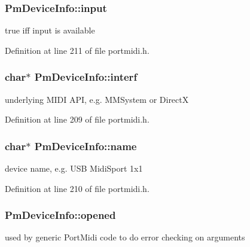 \subsubsection[{\texorpdfstring{input}{input}}]{ Pm\+Device\+Info\+::input}\hypertarget{struct_pm_device_info_a9447230099afd8efc3f57906a02f6eba}{}\label{struct_pm_device_info_a9447230099afd8efc3f57906a02f6eba}
true iff input is available 

Definition at line 211 of file portmidi.\+h.

\subsubsection[{\texorpdfstring{interf}{interf}}]{ char$\ast$ Pm\+Device\+Info\+::interf}\hypertarget{struct_pm_device_info_a8c83e0e882db5a980a007437a806363b}{}\label{struct_pm_device_info_a8c83e0e882db5a980a007437a806363b}
underlying M\+I\+DI A\+PI, e.\+g. M\+M\+System or DirectX 

Definition at line 209 of file portmidi.\+h.

\subsubsection[{\texorpdfstring{name}{name}}]{ char$\ast$ Pm\+Device\+Info\+::name}\hypertarget{struct_pm_device_info_a5f708c92e58b1c77454bffeee1d7c61c}{}\label{struct_pm_device_info_a5f708c92e58b1c77454bffeee1d7c61c}
device name, e.\+g. U\+SB Midi\+Sport 1x1 

Definition at line 210 of file portmidi.\+h.

\subsubsection[{\texorpdfstring{opened}{opened}}]{ Pm\+Device\+Info\+::opened}\hypertarget{struct_pm_device_info_ab4d3d62344b0c525d444bd844e7d70eb}{}\label{struct_pm_device_info_ab4d3d62344b0c525d444bd844e7d70eb}
used by generic Port\+Midi code to do error checking on arguments 

